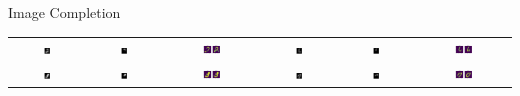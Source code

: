 \documentclass{beamer}
\begin{document}
\begin{frame}{Image Completion}
\begin{tabular}{cccccc}
             \includegraphics[width=0.1\textwidth]{images/2.png} & \includegraphics[width=0.1\textwidth]{images/2.5.png} & \includegraphics[width=0.2\textwidth]{images/pred2.png} &\includegraphics[width=0.1\textwidth]{images/6.png} & \includegraphics[width=0.1\textwidth]{images/6.5.png} & \includegraphics[width=0.2\textwidth]{images/pred6.png} \\
             \includegraphics[width=0.1\textwidth]{images/3.png} & \includegraphics[width=0.1\textwidth]{images/3.5.png} & \includegraphics[width=0.2\textwidth]{images/pred3.png} & \includegraphics[width=0.1\textwidth]{images/7.png} & \includegraphics[width=0.1\textwidth]{images/7.5.png} & \includegraphics[width=0.2\textwidth]{images/pred7.png}
        \end{tabular}
    \end{frame}
    
\end{document}
